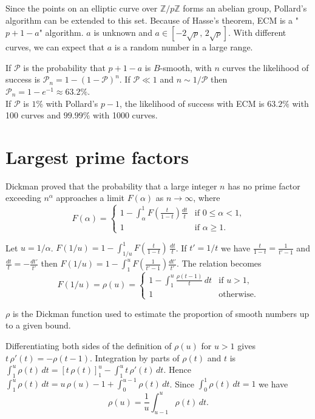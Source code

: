 \documentclass[a4paper, 11pt, pdftex]{report}
\theoremstyle{plain}
\theoremstyle{definition}
\begin{document}
Since the points on an elliptic curve over $\mathbb{Z}/p\mathbb{Z}$ forms an abelian group,
Pollard's algorithm can be extended to this set. Because of Hasse's theorem, ECM is a
"$p + 1 - a$" algorithm. $a$ is unknown and $a \in [-2\sqrt{p},\, 2\sqrt{p}]$. With different curves,
we can expect that $a$ is a random number in a large range.

If $\mathcal{P}$ is the probability that $p + 1 - a$ is $B$-smooth, with $n$ curves
the likelihood of success is $\mathcal{P}_n = 1 - (1 - \mathcal{P})^n$. If $\mathcal{P} \ll 1$
and $n \sim 1/\mathcal{P}$ then $\mathcal{P}_n = 1 - e^{-1} \approx 63.2\% $.\\
If $\mathcal{P}$ is $1\%$ with Pollard's $p - 1$, the likelihood of success with ECM
is $63.2\% $ with 100 curves and $99.99\% $ with 1000 curves.

\section{Largest prime factors} \label{chap:l_prm_fact}

Dickman \cite{Dickman1} proved that the probability that a large integer $n$ has no prime factor
exceeding $n^\alpha$ approaches a limit $F(\alpha)$ as $n \to \infty$, where
\begin{equation*}
F(\alpha) = \begin{cases}
1 - \int_\alpha^1 F \left(\frac{t}{1-t} \right) \frac{dt}{t} & \text{if } 0 \leq \alpha < 1 \text{,}\\
1& \text{if } \alpha \geq 1 \text{.}
\end{cases}
\end{equation*}

Let $u = 1/\alpha$. $F(1/u) = 1 - \int_{1/u}^1 F \left(\frac{t}{1-t} \right)\, \frac{dt}{t}$.
If $t' = 1/t$ we have $\frac{t}{1-t} = \frac{1}{t' - 1}$ and $\frac{dt}{t} = -\frac{dt'}{t'}$
then $F(1/u) = 1 - \int_1^u F \left(\frac{1}{t' - 1} \right) \frac{dt'}{t'}$. The relation becomes
\begin{equation*}
F(1/u) = \rho(u) = \begin{cases}
1 - \int_1^u \frac{\rho(t - 1)}{t}\, dt & \text{if } u > 1 \text{,}\\
1 & \text{otherwise.}
\end{cases}
\end{equation*}

$\rho$ is the Dickman function used to estimate the proportion of smooth numbers up to a given bound.

Differentiating both sides of the definition of $\rho(u)$ for $u > 1$ gives
$t\, \rho'(t) = -\rho(t - 1)$. Integration by parts of $\rho(t)$ and $t$ is
$\int_1^u \rho(t)\, dt = \left[ t\, \rho(t) \right]_1^u - \int_1^u t\, \rho'(t)\, dt$. Hence
$\int_1^u \rho(t)\, dt = u\, \rho(u) - 1 + \int_0^{u-1} \rho(t) \, dt$. Since
$\int_0^1 \rho(t) \, dt = 1$ we have
$$\rho(u) = \frac{1}{u} \int_{u - 1}^u \rho(t)\, dt.$$
\end{document}
